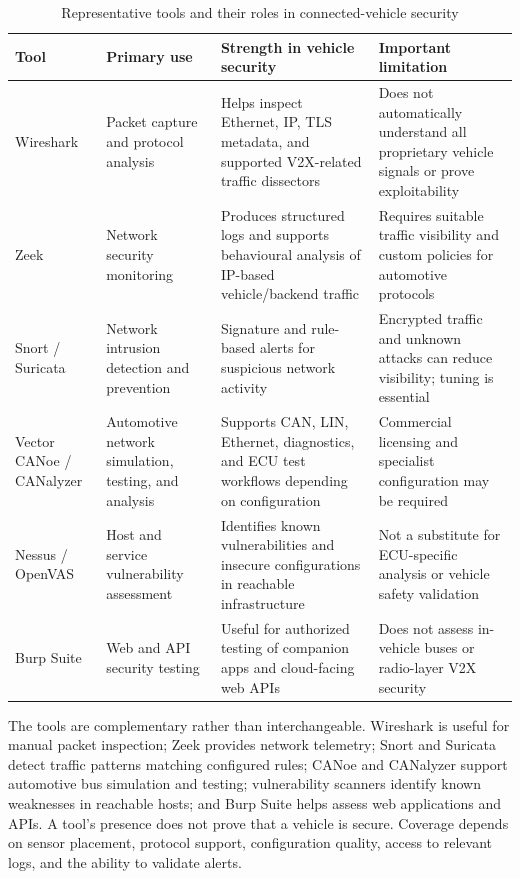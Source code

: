 \documentclass[11pt]{article}
\begin{document}
\begin{table}[t]
\centering
\caption{Representative tools and their roles in connected-vehicle security}
\small
\begin{tabularx}{\textwidth}{p{2.3cm}p{3.2cm}Xp{3.0cm}}
\toprule
\textbf{Tool} & \textbf{Primary use} & \textbf{Strength in vehicle security} & \textbf{Important limitation}\\
\midrule
Wireshark & Packet capture and protocol analysis & Helps inspect Ethernet, IP, TLS metadata, and supported V2X-related traffic dissectors & Does not automatically understand all proprietary vehicle signals or prove exploitability\\
Zeek & Network security monitoring & Produces structured logs and supports behavioural analysis of IP-based vehicle/backend traffic & Requires suitable traffic visibility and custom policies for automotive protocols\\
Snort / Suricata & Network intrusion detection and prevention & Signature and rule-based alerts for suspicious network activity & Encrypted traffic and unknown attacks can reduce visibility; tuning is essential\\
Vector CANoe / CANalyzer & Automotive network simulation, testing, and analysis & Supports CAN, LIN, Ethernet, diagnostics, and ECU test workflows depending on configuration & Commercial licensing and specialist configuration may be required\\
Nessus / OpenVAS & Host and service vulnerability assessment & Identifies known vulnerabilities and insecure configurations in reachable infrastructure & Not a substitute for ECU-specific analysis or vehicle safety validation\\
Burp Suite & Web and API security testing & Useful for authorized testing of companion apps and cloud-facing web APIs & Does not assess in-vehicle buses or radio-layer V2X security\\
\bottomrule
\end{tabularx}
\end{table}

The tools are complementary rather than interchangeable. Wireshark is useful for manual packet inspection; Zeek provides network telemetry; Snort and Suricata detect traffic patterns matching configured rules; CANoe and CANalyzer support automotive bus simulation and testing; vulnerability scanners identify known weaknesses in reachable hosts; and Burp Suite helps assess web applications and APIs. A tool's presence does not prove that a vehicle is secure. Coverage depends on sensor placement, protocol support, configuration quality, access to relevant logs, and the ability to validate alerts.
\end{document}
